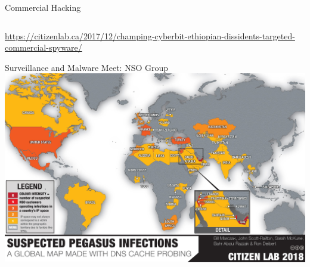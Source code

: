 \documentclass[nobackground,dvipsnames,table,aspectratio=169]{beamer}
\begin{document}
\begin{frame}{Commercial Hacking}
\begin{columns}
    \end{columns}
    \tiny
    \url{https://citizenlab.ca/2017/12/champing-cyberbit-ethiopian-dissidents-targeted-commercial-spyware/}
\end{frame}

\begin{frame}{Surveillance and Malware Meet: NSO Group}
    \includegraphics[width=\textwidth]{pegasus-infection-map}
\end{frame}
\end{document}
